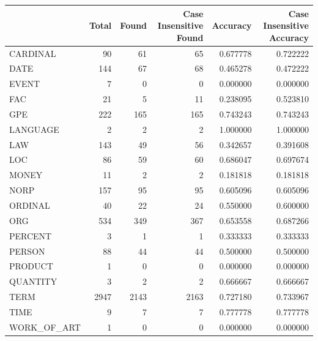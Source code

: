 \begin{tabular}{lrrrrr}
\toprule
 & Total & Found & Case Insensitive Found & Accuracy & Case Insensitive Accuracy \\
\midrule
CARDINAL & 90 & 61 & 65 & 0.677778 & 0.722222 \\
DATE & 144 & 67 & 68 & 0.465278 & 0.472222 \\
EVENT & 7 & 0 & 0 & 0.000000 & 0.000000 \\
FAC & 21 & 5 & 11 & 0.238095 & 0.523810 \\
GPE & 222 & 165 & 165 & 0.743243 & 0.743243 \\
LANGUAGE & 2 & 2 & 2 & 1.000000 & 1.000000 \\
LAW & 143 & 49 & 56 & 0.342657 & 0.391608 \\
LOC & 86 & 59 & 60 & 0.686047 & 0.697674 \\
MONEY & 11 & 2 & 2 & 0.181818 & 0.181818 \\
NORP & 157 & 95 & 95 & 0.605096 & 0.605096 \\
ORDINAL & 40 & 22 & 24 & 0.550000 & 0.600000 \\
ORG & 534 & 349 & 367 & 0.653558 & 0.687266 \\
PERCENT & 3 & 1 & 1 & 0.333333 & 0.333333 \\
PERSON & 88 & 44 & 44 & 0.500000 & 0.500000 \\
PRODUCT & 1 & 0 & 0 & 0.000000 & 0.000000 \\
QUANTITY & 3 & 2 & 2 & 0.666667 & 0.666667 \\
TERM & 2947 & 2143 & 2163 & 0.727180 & 0.733967 \\
TIME & 9 & 7 & 7 & 0.777778 & 0.777778 \\
WORK_OF_ART & 1 & 0 & 0 & 0.000000 & 0.000000 \\
\bottomrule
\end{tabular}
